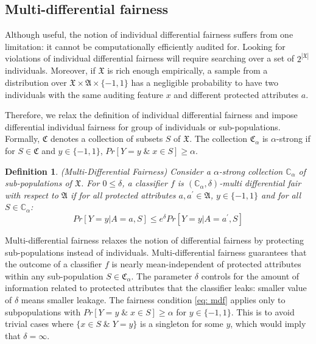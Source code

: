 \documentclass{article}
\newtheorem{defn}{Definition}[section]
\begin{document}
\subsection{Multi-differential fairness}
Although useful, the notion of individual differential fairness suffers from one limitation: it cannot be computationally efficiently audited for. Looking for violations of individual differential fairness will require searching over a set of $2^{|\mathfrak{X}|}$ individuals. Moreover, if $\mathfrak{X}$ is rich enough empirically, a sample from a distribution over $\mathfrak{X} \times \mathfrak{A}\times \{-1, 1\}$ has a negligible probability to have two individuals with the same auditing feature $x$ and different protected attributes $a$. 

\bigskip
Therefore, we relax the definition of individual differential fairness and impose differential individual fairness for group of individuals or sub-populations. Formally, $\mathfrak{C}$ denotes a collection of subsets $S$ of $\mathfrak{X}$. The collection $\mathfrak{C}_{\alpha}$ is $\alpha$-strong if for $S\in \mathfrak{C}$ and $y\in \{-1, 1\}$, $Pr[Y=y \;\&\; x\in S] \geq \alpha$.  

\begin{defn}(Multi-Differential Fairness)
\label{def: mdf}
Consider a $\alpha$-strong collection $\mathbb{C}_{\alpha}$ of sub-populations of $\mathfrak{X}$. For $0\leq \delta$, a classifier $f$ is $(\mathbb{C}_{\alpha}, \delta)$-multi differential fair with respect to $\mathfrak{A}$ if for all protected attributes $a, a^{'}\in \mathfrak{A}$, $y\in\{-1, 1\}$ and for all $S\in \mathbb{C}_{\alpha}$:
\begin{equation}
\label{eq: mdf}
Pr[Y=y|A=a, S] \leq e^{\delta} Pr[Y=y|A=a^{'}, S]
\end{equation}
\end{defn}

Multi-differential fairness relaxes the notion of differential fairness by protecting sub-populations instead of individuals. Multi-differential fairness guarantees that the outcome of a classifier $f$ is nearly mean-independent of protected attributes within any sub-population $S\in \mathfrak{C}_{\alpha}$. The parameter $\delta$ controls for the amount of information related to protected attributes that the classifier leaks: smaller value of $\delta$ means smaller leakage. The fairness condition \ref{eq: mdf} applies only to subpopulations with $Pr[Y=y \;\&\; x\in S] \geq \alpha$ for $y\in\{-1, 1\}$. This is to avoid trivial cases where $\{x\in S \; \& \; Y=y\}$ is a singleton for some $y$, which would imply that $\delta=\infty$. 
\end{document}
